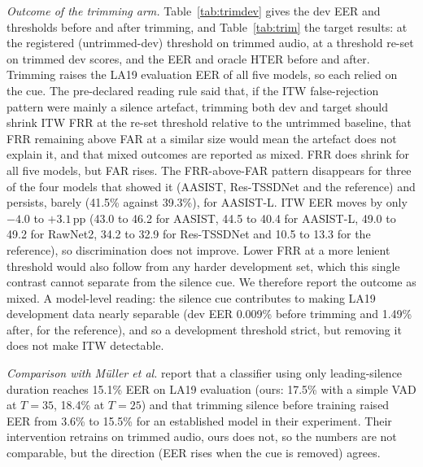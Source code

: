 \documentclass[10pt]{article}
\newcommand{\tauE}{\tau^{*}_{\mathrm{EER}}}
\newcommand{\wide}[1]{\begingroup\footnotesize\setlength{\tabcolsep}{3.5pt}\resizebox{\textwidth}{!}{}\endgroup}
\begin{document}
\begin{table}[!ht]
\caption{FRR (genuine clips) and FAR (spoofs) at \(\tauE\) by leading silence, and the Spearman correlation of score and leading silence
(bona fide clips). Descriptive: leading silence also tracks recording source, so this is not a causal estimate, unlike the trimming arm.}
\label{tab:silfrr}
\centering
\wide{s_tab_silence_frr}
\end{table}

\emph{Outcome of the trimming arm.} Table~\ref{tab:trimdev} gives the dev EER and thresholds before and after trimming, and
Table~\ref{tab:trim} the target results: at the registered (untrimmed-dev) threshold on trimmed audio, at a threshold re-set on trimmed dev
scores, and the EER and oracle HTER before and after. Trimming raises the LA19 evaluation EER of all five models, so each relied on the
cue. The pre-declared reading rule said that, if the ITW false-rejection pattern were mainly a silence artefact, trimming both dev and target
should shrink ITW FRR at the re-set threshold relative to the untrimmed baseline, that FRR remaining above FAR at a similar size would mean the
artefact does not explain it, and that mixed outcomes are reported as mixed. FRR does shrink for all five models, but FAR rises. The FRR-above-FAR pattern disappears for three of the four models that showed it (AASIST, Res-TSSDNet and the reference) and persists, barely
(41.5\% against 39.3\%), for AASIST-L. ITW EER moves by only \(-4.0\) to \(+3.1\)\,pp (43.0 to 46.2 for AASIST, 44.5
to 40.4 for AASIST-L, 49.0 to 49.2 for RawNet2, 34.2 to 32.9 for Res-TSSDNet and 10.5 to 13.3 for the reference), so discrimination does not
improve. Lower FRR at a more lenient threshold would also follow from any harder development set, which this single contrast cannot separate
from the silence cue. We therefore report the outcome as mixed. A model-level reading: the silence cue contributes to making LA19 development
data nearly separable (dev EER 0.009\% before trimming and 1.49\% after, for the reference), and so a development threshold strict, but removing
it does not make ITW detectable.

\emph{Comparison with M\"uller et al.} \cite{muller21_silence} report that a classifier using only leading-silence duration reaches 15.1\% EER
on LA19 evaluation (ours: 17.5\% with a simple VAD at \(T=35\), 18.4\% at \(T=25\)) and that trimming silence before training raised EER from
3.6\% to 15.5\% for an established model in their experiment. Their intervention retrains on trimmed audio, ours does not, so the numbers are not comparable, but the direction (EER rises when the cue is removed) agrees.
\end{document}
